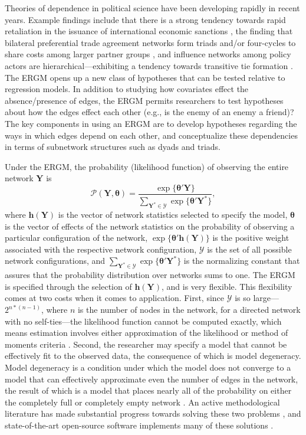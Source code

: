 \documentclass[fleqn,12pt]{wlscirep}
\newcommand{\bt}{\pmb{\theta}}
\newcommand{\bh}{\bm{h}}
\begin{document}
Theories of dependence in political science have been developing rapidly in recent years. Example findings include that there is a strong tendency towards rapid retaliation in the issuance of international economic sanctions \citep{cranmer2014reciprocity}, the finding that bilateral preferential trade agreement networks form triads and/or four-cycles to share costs among larger partner groups \citep{milewicz2018beyond}, and influence networks among policy actors are hierarchical---exhibiting a tendency towards transitive tie formation \citep{christopoulos2015exceptional}.  The ERGM opens up a new class of hypotheses that can be tested relative to regression models. In addition to studying how covariates effect the absence/presence of edges, the ERGM permits researchers to test hypotheses about how the edges effect each other (e.g., is the enemy of an enemy a friend)? The key components in using an ERGM are to develop hypotheses regarding the ways in which edges depend on each other, and conceptualize these dependencies in terms of subnetwork structures such as dyads and triads.


Under the ERGM, the probability (likelihood function) of observing the entire network $\bm{Y}$ is 
$$ \mathcal{P}(\bm{Y}, \bt) = \frac{\exp \{ \bt' \bm{Y}  \}}{\sum_{\bm{Y}^* \in \mathcal{Y}} \exp \{\bt ' \bm{Y}^*  \}},$$
where $ \bh(\bm{Y})$ is the vector of network statistics selected to specify the model, $\bt$ is the vector of effects of the network statistics on the probability of observing a particular configuration of the network, $\exp \{\bt' \bh(\bm{Y}) \}$ is the positive weight associated with the respective network configuration, $\mathcal{Y}$ is the set of all possible network configurations, and $ \sum_{\bm{Y}^* \in \mathcal{Y}} \exp \{\bt ' \bm{Y}^*  \} $ is the normalizing constant that assures that the probability distribution over networks sums to one. The ERGM is specified through the selection of $ \bh(\bm{Y})$, and is very flexible. This flexibility comes at two costs when it comes to application. First, since $\mathcal{Y}$ is so large---$2^{n*(n-1)}$, where $n$ is the number of nodes in the network, for a directed network with no self-ties---the likelihood function cannot be computed exactly, which means estimation involves either approximation of the likelihood or method of moments criteria \citep{hummel2012improving,schmid2017exponential,he2016estimating}.  Second, the researcher may specify a model that cannot be effectively fit to the observed data, the consequence of which is model degeneracy. Model degeneracy is a condition under which the model does not converge to a model that can effectively approximate even the number of edges in the network, the result of which is a model that places nearly all of the probability on either the completely full or completely empty network \citep{schweinberger2011instability}.  An active methodological literature has made substantial progress towards solving these two problems \citep[e.g., ][]{demuse2018phase}, and state-of-the-art open-source software implements many of these solutions \citep{hunter2008ergm}. 
\end{document}
